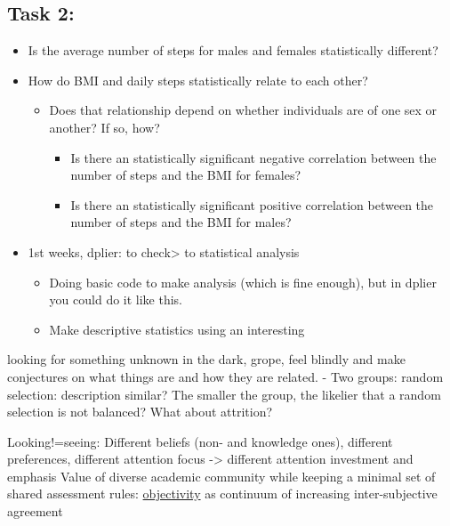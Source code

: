 \documentclass[
]{book}
\providecommand{\tightlist}{%
  \setlength{\itemsep}{0pt}\setlength{\parskip}{0pt}}
\begin{document}
\hypertarget{task-2}{%
\subsection{Task 2:}\label{task-2}}

\begin{itemize}
\tightlist
\item
  Is the average number of steps for males and females statistically different?
\item
  How do BMI and daily steps statistically relate to each other?

  \begin{itemize}
  \tightlist
  \item
    Does that relationship depend on whether individuals are of one sex or another? If so, how?

    \begin{itemize}
    \tightlist
    \item
      Is there an statistically significant negative correlation between the number of steps and the BMI for females?
    \item
      Is there an statistically significant positive correlation between the number of steps and the BMI for males?
    \end{itemize}
  \end{itemize}
\item
  1st weeks, dplier: to check\textgreater{} to statistical analysis

  \begin{itemize}
  \tightlist
  \item
    Doing basic code to make analysis (which is fine enough), but in dplier you could do it like this.
  \item
    Make descriptive statistics using an interesting
  \end{itemize}
\end{itemize}

looking for something unknown in the dark, grope, feel blindly and make conjectures on what things are and how they are related.
- Two groups: random selection: description similar? The smaller the group, the likelier that a random selection is not balanced? What about attrition?

Looking!=seeing:
Different beliefs (non- and knowledge ones), different preferences, different attention focus -\textgreater{} different attention investment and emphasis
Value of diverse academic community while keeping a minimal set of shared assessment rules: \href{https://plato.stanford.edu/entries/scientific-objectivity/}{objectivity} as continuum of increasing inter-subjective agreement
\end{document}
